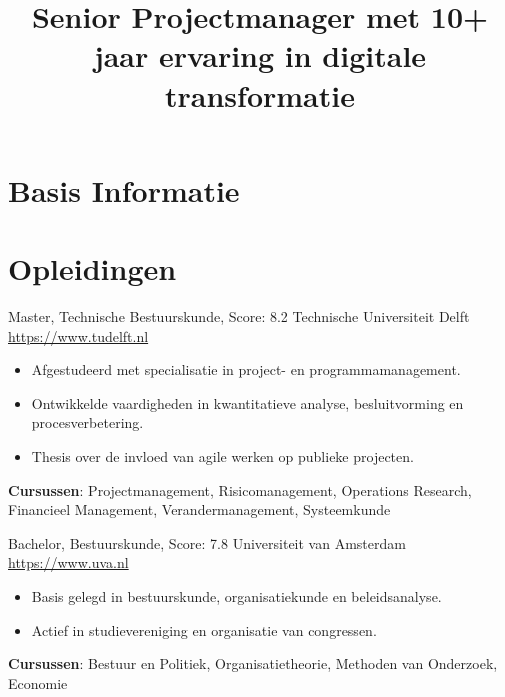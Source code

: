 \documentclass[a4paper, serif, 10pt]{moderncv}
\title{Senior Projectmanager met 10+ jaar ervaring in digitale transformatie}
\begin{document}
\maketitle

\section{Basis Informatie}

\section{Opleidingen}

        {Master, Technische Bestuurskunde, Score: 8.2}
        {Technische Universiteit Delft}
        {\url{https://www.tudelft.nl}}
        {}
        {\begin{itemize}
\item Afgestudeerd met specialisatie in project- en programmamanagement.
\item Ontwikkelde vaardigheden in kwantitatieve analyse, besluitvorming en procesverbetering.
\item Thesis over de invloed van agile werken op publieke projecten.
\end{itemize}
\textbf{Cursussen}: Projectmanagement, Risicomanagement, Operations Research, Financieel Management, Verandermanagement, Systeemkunde}

        {Bachelor, Bestuurskunde, Score: 7.8}
        {Universiteit van Amsterdam}
        {\url{https://www.uva.nl}}
        {}
        {\begin{itemize}
\item Basis gelegd in bestuurskunde, organisatiekunde en beleidsanalyse.
\item Actief in studievereniging en organisatie van congressen.
\end{itemize}
\textbf{Cursussen}: Bestuur en Politiek, Organisatietheorie, Methoden van Onderzoek, Economie}
\end{document}

